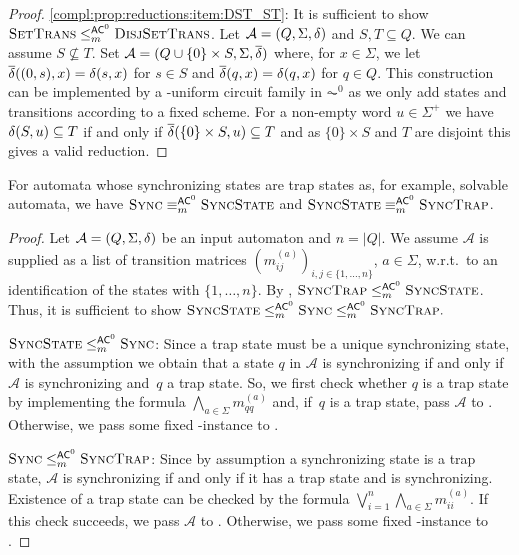 \begin{proof}
	\ref{compl:prop:reductions:item:DST_ST}: It is sufficient to show
	$\textsc{\sc Set\-Trans} \le_m^{\textup{\textsf{AC}}^0} \textsc{\sc Disj\-Set\-Trans}$. Let $\mathcal A = (Q, \Sigma, \delta)$
	and $S, T \subseteq Q$. We can assume $S \not\subseteq T$.
	Set $\mathcal \overline{\mathcal A} = (Q \cup \{0\} \times S, \Sigma, \overline{\delta})$
	where, for $x \in \Sigma$,
	we let $\overline{\delta}((0, s),x) = \delta(s,x)$
	for $s \in S$
	and $\overline{\delta}(q,x) = \delta(q,x)$
	for $q \in Q$.
	This construction can be implemented by a \LOGSPACE-uniform circuit family in $\AC^0$ as we only add states
	and transitions according to a fixed scheme. 
	For a non-empty word $u \in \Sigma^+$
	we have $\delta(S,u) \subseteq T$
	if and only if $\overline{\delta}(\{0\} \times S,u) \subseteq T$
	and as $\{0\} \times S$ and $T$ are disjoint this gives a valid reduction.
\end{proof}

\begin{proposition}  \label{compl:prop:reductions_trap}
	For automata whose synchronizing states are trap states
	as, for example, solvable automata,
	we have
	$\text{\sc Sync} \equiv_m^{\textup{\textsf{AC}}^0} \text{\sc Sync\-State}$ and
	$\text{\sc Sync\-State} \equiv_m^{\textup{\textsf{AC}}^0} \textsc{\sc Sync\-Trap}$.
\end{proposition}
\begin{proof}	
	Let $\mathcal A = (Q, \Sigma, \delta)$
	be an input automaton and $n = |Q|$.
	We assume $\mathcal A$ is supplied 
	as a list of transition matrices $(m_{ij}^{(a)})_{i,j \in \{1,\ldots,n\}}$, $a \in \Sigma$,
	w.r.t.~to an identification of the states with $\{1,\ldots,n\}$.	
	By , 
	$\textsc{\sc Sync\-Trap} \le_m^{\textup{\textsf{AC}}^0} \text{\sc Sync\-State}$.
	Thus, it is sufficient to show
	$
	\text{\sc Sync\-State} \le_m^{\textup{\textsf{AC}}^0} 
	\text{\sc Sync} \le_m^{\textup{\textsf{AC}}^0} 
	\textsc{\sc Sync\-Trap}.
	$
	
	\medskip 
	\noindent\underline{$\text{\sc Sync\-State} \le_m^{\textup{\textsf{AC}}^0} \text{\sc Sync}$}: Since a trap state must be a unique synchronizing state,
	with the assumption we obtain that a state $q$ in 
	$\mathcal A$
	is synchronizing if and only if $\mathcal A$ is synchronizing
	and~$q$ a trap state.
	So, we first check whether $q$ is a trap
	state by implementing the formula $\bigwedge_{a \in \Sigma} m_{qq}^{(a)}$
	and, if~$q$ is a trap state,
	pass $\mathcal A$ to \DFAS.
	Otherwise, we pass some fixed \rNO-instance
	to \DFAS.
	
	\medskip 
	\noindent\underline{$\text{\sc Sync} \le_m^{\textup{\textsf{AC}}^0} \textsc{\sc Sync\-Trap}$}:
	Since by assumption a synchronizing state is a trap state,
	$\mathcal A$ is synchronizing if and only if it has a trap 
	state and is synchronizing. Existence of a trap state 
	can be checked by the formula $\bigvee_{i = 1}^n \bigwedge_{a \in \Sigma} m_{ii}^{(a)}$.
	If this check succeeds,	we pass $\mathcal A$ to \DFAST. 
	Otherwise, we pass some fixed \rNO-instance to \DFAST.
\end{proof}

